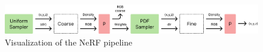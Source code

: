 \begin{figure}
    \centering
    \includegraphics[width=1.0\textwidth]{figures/nerf-pipeline.png}
    \caption{Visualization of the NeRF pipeline}
    \label{fig:nerf-pipeline}
\end{figure}